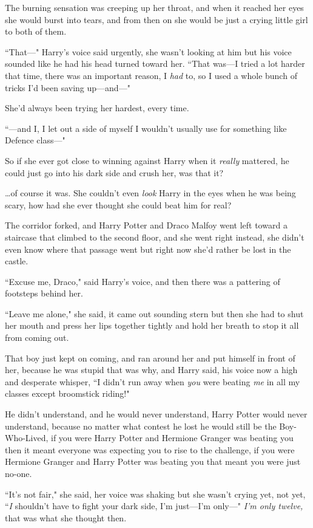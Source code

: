 The burning sensation was creeping up her throat, and when it reached her eyes she would burst into tears, and from then on she would be just a crying little girl to both of them.

``That—" Harry's voice said urgently, she wasn't looking at him but his voice sounded like he had his head turned toward her. ``That was—I tried a lot harder that time, there was an important reason, I \emph{had} to, so I used a whole bunch of tricks I'd been saving up—and—"

She'd always been trying her hardest, every time.

``—and I, I let out a side of myself I wouldn't usually use for something like Defence class—"

So if she ever got close to winning against Harry when it \emph{really} mattered, he could just go into his dark side and crush her, was that it?

{\ldots}of course it was. She couldn't even \emph{look} Harry in the eyes when he was being scary, how had she ever thought she could beat him for real?

The corridor forked, and Harry Potter and Draco Malfoy went left toward a staircase that climbed to the second floor, and she went right instead, she didn't even know where that passage went but right now she'd rather be lost in the castle.

``Excuse me, Draco," said Harry's voice, and then there was a pattering of footsteps behind her.

``Leave me alone," she said, it came out sounding stern but then she had to shut her mouth and press her lips together tightly and hold her breath to stop it all from coming out.

That boy just kept on coming, and ran around her and put himself in front of her, because he was stupid that was why, and Harry said, his voice now a high and desperate whisper, ``I didn't run away when \emph{you} were beating \emph{me} in all my classes except broomstick riding!"

He didn't understand, and he would never understand, Harry Potter would never understand, because no matter what contest he lost he would still be the Boy-Who-Lived, if you were Harry Potter and Hermione Granger was beating you then it meant everyone was expecting you to rise to the challenge, if you were Hermione Granger and Harry Potter was beating you that meant you were just no-one.

``It's not fair," she said, her voice was shaking but she wasn't crying yet, not yet, ``\emph{I} shouldn't have to fight your dark side, I'm just—I'm only—" \emph{I'm only twelve,} that was what she thought then.

